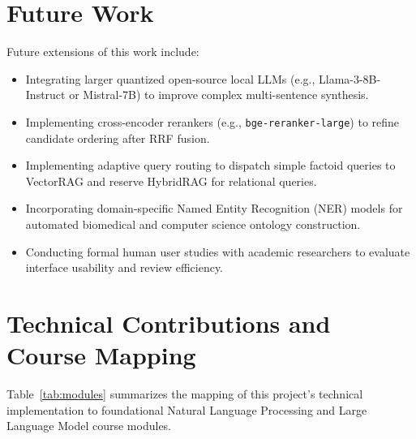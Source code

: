 \documentclass[conference]{IEEEtran}
\begin{document}
\section{Future Work}

Future extensions of this work include:
\begin{itemize}
\item Integrating larger quantized open-source local LLMs (e.g., Llama-3-8B-Instruct or Mistral-7B) to improve complex multi-sentence synthesis.
\item Implementing cross-encoder rerankers (e.g., \texttt{bge-reranker-large}) to refine candidate ordering after RRF fusion.
\item Implementing adaptive query routing to dispatch simple factoid queries to VectorRAG and reserve HybridRAG for relational queries.
\item Incorporating domain-specific Named Entity Recognition (NER) models for automated biomedical and computer science ontology construction.
\item Conducting formal human user studies with academic researchers to evaluate interface usability and review efficiency.
\end{itemize}


\section{Technical Contributions and Course Mapping}

Table~\ref{tab:modules} summarizes the mapping of this project's technical implementation to foundational Natural Language Processing and Large Language Model course modules.
\end{document}
